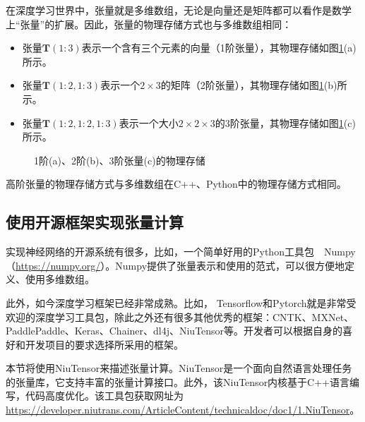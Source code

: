 \parinterval 在深度学习世界中，张量就是多维数组，无论是向量还是矩阵都可以看作是数学上``张量''的扩展。因此，张量的物理存储方式也与多维数组相同：

\begin{itemize}
\vspace{0.5em}
\item 张量$ \mathbf T(1:3) $表示一个含有三个元素的向量（1阶张量），其物理存储如图\ref{fig:5-29}(a)所示。
\vspace{0.5em}
\item 张量$ \mathbf T(1:2,1:3) $表示一个$ 2\times 3 $的矩阵（2阶张量），其物理存储如图\ref{fig:5-29}(b)所示。
\vspace{0.5em}
\item 张量$ \mathbf T(1:2,1:2,1:3) $表示一个大小$ 2\times 2\times 3 $的3阶张量，其物理存储如图\ref{fig:5-29}(c)所示。
\vspace{0.5em}
\end{itemize}

\begin{figure}[htp]
\centering

\caption{1阶(a)、2阶(b)、3阶张量(c)的物理存储}
\label{fig:5-29}
\end{figure}

\parinterval 高阶张量的物理存储方式与多维数组在C++、Python中的物理存储方式相同。


\subsection{使用开源框架实现张量计算}

\parinterval 实现神经网络的开源系统有很多，比如，一个简单好用的Python工具包\ \dash \ Numpy（\url{https://numpy.org/}）。Numpy提供了张量表示和使用的范式，可以很方便地定义、使用多维数组。

\parinterval 此外，如今深度学习框架已经非常成熟。比如， Tensorflow和Pytorch就是非常受欢迎的深度学习工具包，除此之外还有很多其他优秀的框架：CNTK、MXNet、\\PaddlePaddle、Keras、Chainer、dl4j、NiuTensor等。开发者可以根据自身的喜好和开发项目的要求选择所采用的框架。

\parinterval 本节将使用NiuTensor来描述张量计算。NiuTensor是一个面向自然语言处理任务的张量库，它支持丰富的张量计算接口。此外，该NiuTensor内核基于C++语言编写，代码高度优化。该工具包获取网址为\url{https://developer.niutrans.com/ArticleContent/technicaldoc/doc1/1.NiuTensor}。

